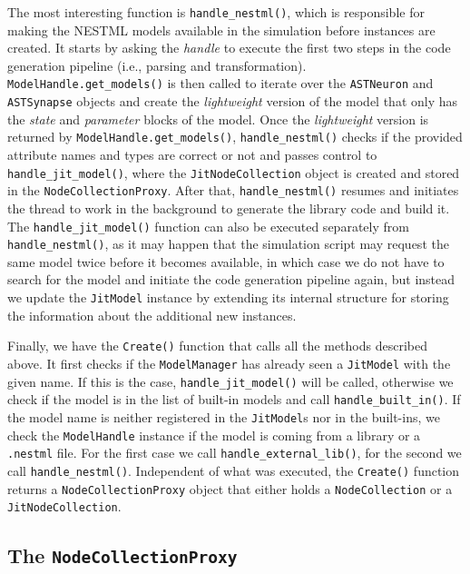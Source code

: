 The most interesting function is \texttt{handle\_nestml()}, which is responsible for making the NESTML models available in the simulation before instances are created. It starts by asking the \emph{handle} to execute the first two steps in the code generation pipeline (i.e., parsing and transformation). \texttt{ModelHandle.get\_models()} is then called to iterate over the \texttt{ASTNeuron} and \texttt{ASTSynapse} objects and create the \emph{lightweight} version of the model that only has the \emph{state} and \emph{parameter} blocks of the model. Once the \emph{lightweight} version is returned by \texttt{ModelHandle.get\_models()}, \texttt{handle\_nestml()} checks if the provided attribute names and types are correct or not and passes control to \texttt{handle\_jit\_model()}, where the \texttt{JitNodeCollection} object is created and stored in the \texttt{NodeCollectionProxy}. After that, \texttt{handle\_nestml()} resumes and initiates the thread to work in the background to generate the library code and build it. The \texttt{handle\_jit\_model()} function can also be executed separately from \texttt{handle\_nestml()}, as it may happen that the simulation script may request the same model twice before it becomes available, in which case we do not have to search for the model and initiate the code generation pipeline again, but instead we update the \texttt{JitModel} instance by extending its internal structure for storing the information about the additional new instances.

Finally, we have the \texttt{Create()} function that calls all the methods described above. It first checks if the \texttt{ModelManager} has already seen a \texttt{JitModel} with the given name. If this is the case, \texttt{handle\_jit\_model()} will be called, otherwise we check if the model is in the list of built-in models and call \texttt{handle\_built\_in()}. If the model name is neither registered in the \texttt{JitModel}s nor in the built-ins, we check the \texttt{ModelHandle} instance if the model is coming from a library or a \texttt{.nestml} file. For the first case we call \texttt{handle\_external\_lib()}, for the second we call \texttt{handle\_nestml()}. Independent of what was executed, the \texttt{Create()} function returns a \texttt{NodeCollectionProxy} object that either holds a \texttt{NodeCollection} or a \texttt{JitNodeCollection}.

\subsection{The \texttt{NodeCollectionProxy}}

